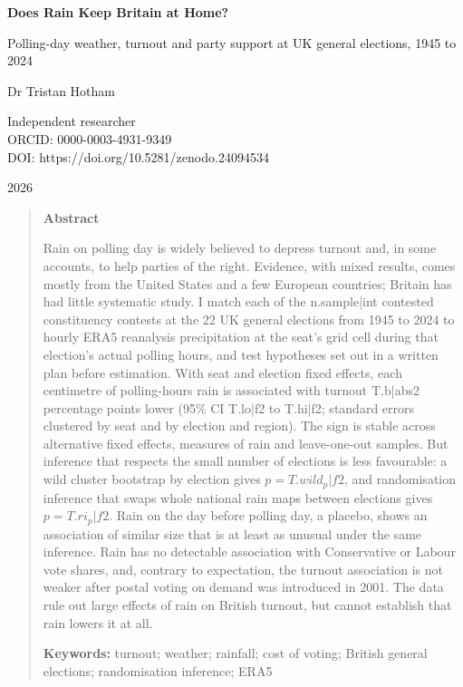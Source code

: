 \documentclass[11pt,a4paper]{article}
\begin{document}
\begin{center}
{\LARGE\bfseries Does Rain Keep Britain at Home?\par}
\vspace{0.4em}
{\large Polling-day weather, turnout and party support at UK general elections, 1945 to 2024\par}
\vspace{1.2em}
{\large Dr Tristan Hotham\par}
\vspace{0.3em}
{\small Independent researcher\\
ORCID: 0000-0003-4931-9349\\
DOI: https://doi.org/10.5281/zenodo.24094534\par}
\vspace{0.8em}
2026
\end{center}

\begin{quote}
\small
\begin{center}\textbf{Abstract}\end{center}
Rain on polling day is widely believed to depress turnout and, in some accounts, to help parties of the right. Evidence, with mixed results, comes mostly from the United States and a few European countries; Britain has had little systematic study. I match each of the {{n.sample|int}} contested constituency contests at the 22 UK general elections from 1945 to 2024 to hourly ERA5 reanalysis precipitation at the seat's grid cell during that election's actual polling hours, and test hypotheses set out in a written plan before estimation. With seat and election fixed effects, each centimetre of polling-hours rain is associated with turnout {{T.b|abs2}} percentage points lower (95\% CI {{T.lo|f2}} to {{T.hi|f2}}; standard errors clustered by seat and by election and region). The sign is stable across alternative fixed effects, measures of rain and leave-one-out samples. But inference that respects the small number of elections is less favourable: a wild cluster bootstrap by election gives $p={{T.wild_p|f2}}$, and randomisation inference that swaps whole national rain maps between elections gives $p={{T.ri_p|f2}}$. Rain on the day before polling day, a placebo, shows an association of similar size that is at least as unusual under the same inference. Rain has no detectable association with Conservative or Labour vote shares, and, contrary to expectation, the turnout association is not weaker after postal voting on demand was introduced in 2001. The data rule out large effects of rain on British turnout, but cannot establish that rain lowers it at all.

\textbf{Keywords:} turnout; weather; rainfall; cost of voting; British general elections; randomisation inference; ERA5
\end{quote}
\end{document}
